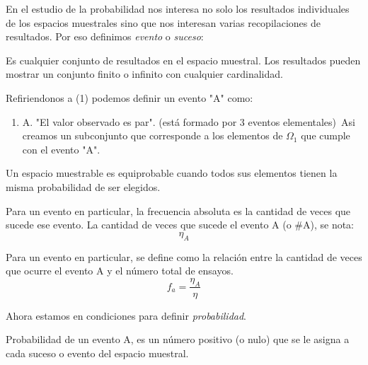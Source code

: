 \documentclass[../main.tex]{subfiles}
\begin{document}
En el estudio de la probabilidad nos interesa no solo los resultados individuales de los espacios muestrales sino que nos interesan varias recopilaciones de resultados. Por eso definimos \textit{evento} o \textit{suceso}:

\begin{definition}
    Es cualquier conjunto de resultados en el espacio muestral. Los resultados pueden mostrar un conjunto finito o infinito con cualquier cardinalidad.
\end{definition}

\begin{example*} Refiriendonos a (1) podemos definir un evento "A" como:
    \begin{enumerate}
        \item A. "El valor observado es par". (está formado por 3 eventos elementales)\
        Asi creamos un subconjunto que corresponde a los elementos de $\Omega_{1}$ que cumple con el evento "A".
    \end{enumerate}
\end{example*}

\begin{definition}
    Un espacio muestrable es equiprobable cuando todos sus elementos tienen la misma probabilidad de ser elegidos.
\end{definition}

\begin{definition}
    Para un evento en particular, la frecuencia absoluta es la cantidad de veces que sucede ese evento. La cantidad de veces que sucede el evento A (o \#A), se nota:
    \begin{equation*}
        \eta_{A}
    \end{equation*}
\end{definition}

\begin{definition}
    Para un evento en particular, se define como la relación entre la cantidad de veces que ocurre el evento A y el número total de ensayos.
    \begin{equation*}
        f_{a} = \frac{\eta_{A}}{\eta}
    \end{equation*}
\end{definition}

Ahora estamos en condiciones para definir \textit{probabilidad}.

\begin{definition}[Probabilidad]
    Probabilidad de un evento A, es un número positivo (o nulo) que se le asigna a cada suceso o evento del espacio muestral.
\end{definition}
\end{document}
